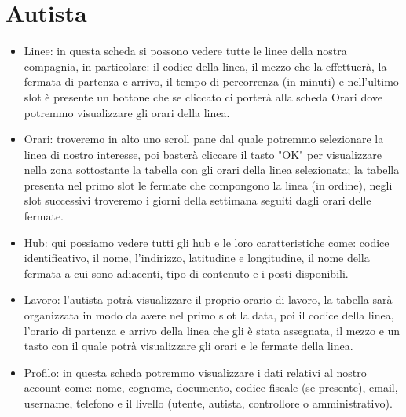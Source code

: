 \documentclass[12pt,a4paper]{report}
\begin{document}
\section{Autista}
\begin{itemize}
    \item Linee: in questa scheda si possono vedere tutte le linee della nostra compagnia, in particolare: il codice della linea, il mezzo che la effettuerà, la fermata di partenza e arrivo, il tempo di percorrenza (in minuti) e nell'ultimo slot è presente un bottone che se cliccato ci porterà alla scheda Orari dove potremmo visualizzare gli orari della linea.
    \item Orari:  troveremo in alto uno scroll pane dal quale potremmo selezionare la linea di nostro interesse, poi basterà cliccare il tasto "OK" per visualizzare nella zona sottostante la tabella con gli orari della linea selezionata; la tabella presenta nel primo slot le fermate che compongono la linea (in ordine), negli slot successivi troveremo i giorni della settimana seguiti dagli orari delle fermate.
    \item Hub: qui possiamo vedere tutti gli hub e le loro caratteristiche come: codice identificativo, il nome, l'indirizzo, latitudine e longitudine, il nome della fermata a cui sono adiacenti, tipo di contenuto e i posti disponibili.
    \item Lavoro: l'autista potrà visualizzare il proprio orario di lavoro, la tabella sarà organizzata in modo da avere nel primo slot la data, poi il codice della linea, l'orario di partenza e arrivo della linea che gli è stata assegnata, il mezzo e un tasto con il quale potrà visualizzare gli orari e le fermate della linea.
    \item Profilo: in questa scheda potremmo visualizzare i dati relativi al nostro account come: nome, cognome, documento, codice fiscale (se presente), email, username, telefono e il livello (utente, autista, controllore o amministrativo).
\end{itemize}
\end{document}
